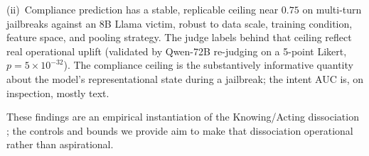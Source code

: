 \documentclass[11pt]{article}
\begin{document}
(ii)~Compliance prediction has a stable, replicable ceiling near $0.75$ on multi-turn jailbreaks against an 8B Llama victim, robust to data scale, training condition, feature space, and pooling strategy. The judge labels behind that ceiling reflect real operational uplift (validated by Qwen-72B re-judging on a 5-point Likert, $p=5\times 10^{-32}$). The compliance ceiling is the substantively informative quantity about the model's representational state during a jailbreak; the intent AUC is, on inspection, mostly text.

These findings are an empirical instantiation of the Knowing/Acting dissociation \citep{wu2026knowingwithoutacting}; the controls and bounds we provide aim to make that dissociation operational rather than aspirational.



\end{document}
